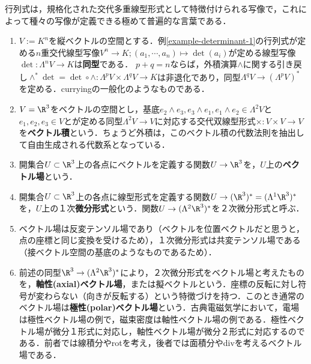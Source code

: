 \documentclass[uplatex,dvipdfmx]{jsreport}
\begin{document}
\begin{example}[行列式の射程]
    行列式は，規格化された交代多重線型形式として特徴付けられる写像で，これによって種々の写像が定義できる極めて普遍的な言葉である．
    \begin{enumerate}
        \item $V:=K^n$を縦ベクトルの空間とする．例\ref{example-determinant-1}の行列式が定める$n$重交代線型写像$V^{n}\to K;(a_1,\cdots,a_n)\mapsto\det(a_i)$が定める線型写像$\det:\Lambda^nV\to K$は\textbf{同型}である．
        $p+q=n$ならば，外積演算$\wedge$に関する引き戻し$\wedge^*\det=\det\circ\wedge:\Lambda^pV\times\Lambda^qV\to K$は非退化であり，同型$\Lambda^qV\to(\Lambda^pV)^*$を定める．curryingの一般化のようなものである．
        \item $V=\R^3$をベクトルの空間とし，基底$e_2\wedge e_3,e_3\wedge e_1,e_1\wedge e_2\in\Lambda^2V$と$e_1,e_2,e_3\in V$とが定める同型$\Lambda^2V\to V$に対応する交代双線型形式$\times:V\times V\to V$を\textbf{ベクトル積}という．ちょうど外積は，このベクトル積の代数法則を抽出して自由生成される代数系となっている．
        \item 開集合$U\subset\R^3$上の各点にベクトルを定義する関数$U\to\R^3$を，$U$上の\textbf{ベクトル場}という．
        \item 開集合$U\subset\R^3$上の各点に線型形式を定義する関数$U\to(\R^3)^*=(\Lambda^1\R^3)^*$を，$U$上の１次\textbf{微分形式}という．関数$U\to(\Lambda^2\R^3)^*$を２次微分形式と呼ぶ．
        \item ベクトル場は反変テンソル場であり（ベクトルを位置ベクトルだと思うと，点の座標と同じ変換を受けるため），１次微分形式は共変テンソル場である（接ベクトル空間の基底のようなものであるため）．
        \item 前述の同型$\R^3\to(\Lambda^2\R^3)^*$により，２次微分形式をベクトル場と考えたものを，\textbf{軸性(axial)ベクトル場}，または擬ベクトルという．座標の反転に対し符号が変わらない（向きが反転する）という特徴づけを持つ．このとき通常のベクトル場は\textbf{極性(polar)ベクトル場}という．古典電磁気学において，電場は極性ベクトル場の例で，磁束密度は軸性ベクトル場の例である．極性ベクトル場が微分１形式に対応し，軸性ベクトル場が微分２形式に対応するのである．前者では線積分やrotを考え，後者では面積分やdivを考えるベクトル場である．
    \end{enumerate}
\end{example}
\end{document}
